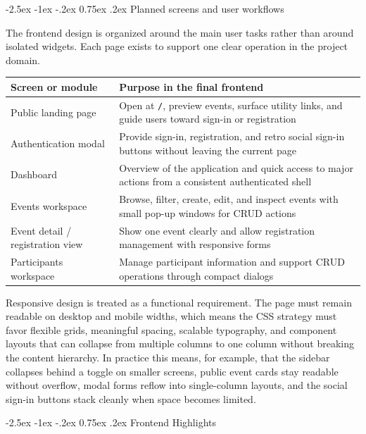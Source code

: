 \documentclass[11pt,a4paper]{article}
\makeatletter
\renewcommand\subsection{\@startsection{subsection}{2}{\z@}%
  {-2.5ex \@plus -1ex \@minus -.2ex}%
  {0.75ex \@plus .2ex}%
  {\normalfont\large\sffamily\bfseries\color{MidnightBlue}}}
\makeatother
\begin{document}
\subsection{Planned screens and user workflows}

The frontend design is organized around the main user tasks rather than around isolated widgets. Each page exists to support one clear operation in the project domain.

\begin{center}
\begin{tabularx}{\textwidth}{@{}lY@{}}
\toprule
\textbf{Screen or module} & \textbf{Purpose in the final frontend} \\
\midrule
Public landing page & Open at \texttt{/}, preview events, surface utility links, and guide users toward sign-in or registration \\
Authentication modal & Provide sign-in, registration, and retro social sign-in buttons without leaving the current page \\
Dashboard & Overview of the application and quick access to major actions from a consistent authenticated shell \\
Events workspace & Browse, filter, create, edit, and inspect events with small pop-up windows for CRUD actions \\
Event detail / registration view & Show one event clearly and allow registration management with responsive forms \\
Participants workspace & Manage participant information and support CRUD operations through compact dialogs \\
\bottomrule
\end{tabularx}
\end{center}

Responsive design is treated as a functional requirement. The page must remain readable on desktop and mobile widths, which means the CSS strategy must favor flexible grids, meaningful spacing, scalable typography, and component layouts that can collapse from multiple columns to one column without breaking the content hierarchy. In practice this means, for example, that the sidebar collapses behind a toggle on smaller screens, public event cards stay readable without overflow, modal forms reflow into single-column layouts, and the social sign-in buttons stack cleanly when space becomes limited.

\subsection{Frontend Highlights}
\end{document}
